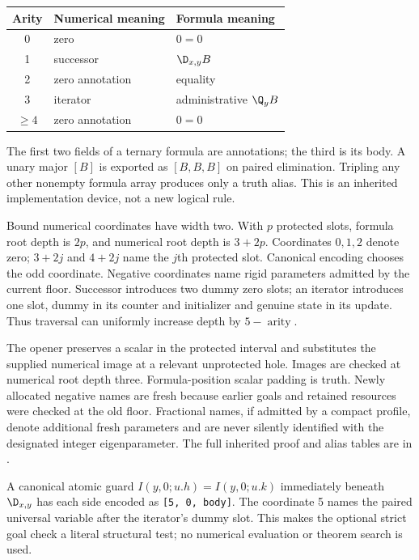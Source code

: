 \begin{center}\small
\begin{tabular}{cll}
\toprule
Arity & Numerical meaning & Formula meaning\\
\midrule
0 & zero & $0=0$\\
1 & successor & $\D_{x,y}B$\\
2 & zero annotation & equality\\
3 & iterator & administrative $\Q_yB$\\
$\geq4$ & zero annotation & $0=0$\\
\bottomrule
\end{tabular}
\end{center}
The first two fields of a ternary formula are annotations; the third
is its body. A unary major $[B]$ is exported as $[B,B,B]$ on paired
elimination. Tripling any other nonempty formula array produces only
a truth alias. This is an inherited implementation device, not a new
logical rule.

Bound numerical coordinates have width two. With $p$ protected slots,
formula root depth is $2p$, and numerical root depth is $3+2p$.
Coordinates $0,1,2$ denote zero; $3+2j$ and $4+2j$ name the $j$th
protected slot. Canonical encoding chooses the odd coordinate.
Negative coordinates name rigid parameters admitted by the current
floor. Successor introduces two dummy zero slots; an iterator introduces
one slot, dummy in its counter and initializer and genuine state in
its update. Thus traversal can uniformly increase depth by
\(5-\operatorname{arity}\).

The opener preserves a scalar in the protected interval and substitutes
the supplied numerical image at a relevant unprotected hole. Images are
checked at numerical root depth three. Formula-position scalar padding
is truth. Newly allocated negative names are fresh because earlier
goals and retained resources were checked at the old floor. Fractional
names, if admitted by a compact profile, denote additional fresh
parameters and are never silently identified with the designated
integer eigenparameter. The full inherited proof and alias tables are
in .

A canonical atomic guard
\(I(y,0;u.h)=I(y,0;u.k)\) immediately beneath $\D_{x,y}$ has each side
encoded as \texttt{[5, 0, body]}. The coordinate 5 names the paired
universal variable after the iterator's dummy slot. This makes the
optional strict goal check a literal structural test; no numerical
evaluation or theorem search is used.

